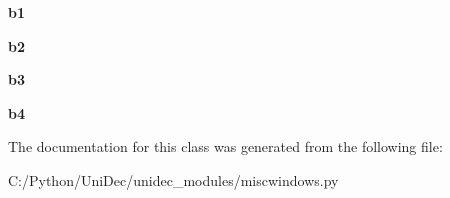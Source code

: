 \begin{DoxyCompactItemize}
\item 
\hypertarget{class_uni_dec_1_1unidec__modules_1_1miscwindows_1_1_save_figure_dialog_aad7424b2c93fbff662e79a275edec7b9}{}{\bfseries b1}\label{class_uni_dec_1_1unidec__modules_1_1miscwindows_1_1_save_figure_dialog_aad7424b2c93fbff662e79a275edec7b9}

\item 
\hypertarget{class_uni_dec_1_1unidec__modules_1_1miscwindows_1_1_save_figure_dialog_a9209881700eb559c083c6319a56cdd54}{}{\bfseries b2}\label{class_uni_dec_1_1unidec__modules_1_1miscwindows_1_1_save_figure_dialog_a9209881700eb559c083c6319a56cdd54}

\item 
\hypertarget{class_uni_dec_1_1unidec__modules_1_1miscwindows_1_1_save_figure_dialog_a06125484846a4215ec2e383c5ef0bd14}{}{\bfseries b3}\label{class_uni_dec_1_1unidec__modules_1_1miscwindows_1_1_save_figure_dialog_a06125484846a4215ec2e383c5ef0bd14}

\item 
\hypertarget{class_uni_dec_1_1unidec__modules_1_1miscwindows_1_1_save_figure_dialog_ac9fd37ab61fe88f44a9d051bf35cfd77}{}{\bfseries b4}\label{class_uni_dec_1_1unidec__modules_1_1miscwindows_1_1_save_figure_dialog_ac9fd37ab61fe88f44a9d051bf35cfd77}

\end{DoxyCompactItemize}


The documentation for this class was generated from the following file\+:\begin{DoxyCompactItemize}
\item 
C\+:/\+Python/\+Uni\+Dec/unidec\+\_\+modules/miscwindows.\+py\end{DoxyCompactItemize}
